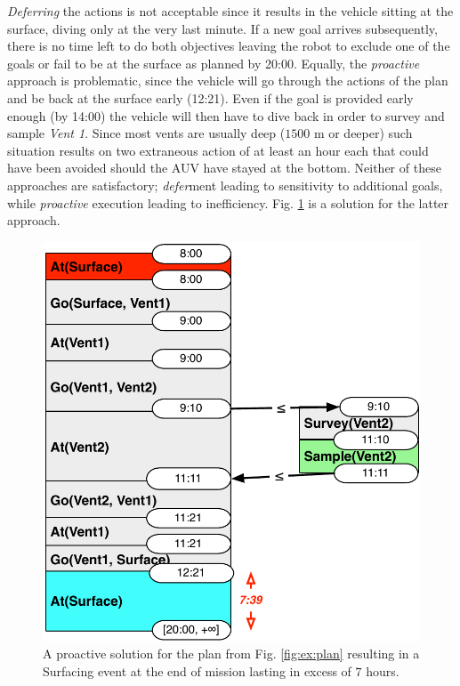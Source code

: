 {\em Deferring} the actions is not acceptable since it results in the
vehicle sitting at the surface, diving only at the very last
minute. If a new goal arrives subsequently, there is no time left to
do both objectives leaving the robot to exclude one of the goals or
fail to be at the surface as planned by 20:00. Equally, the {\em
  proactive} approach is problematic, since the vehicle will go
through the actions of the plan and be back at the surface early
(12:21). Even if the goal is provided early enough (by 14:00) the
vehicle will then have to dive back in order to survey and sample {\em
  Vent 1}.
Since most vents are usually deep ($1500$ m or deeper) such situation
results on two extraneous action of at least an hour each that could
have been avoided should the AUV have stayed at the bottom.
Neither of these approaches are satisfactory; {\em defer}ment leading 
to sensitivity to additional goals, while \emph{proactive} execution 
leading to inefficiency. Fig. \ref{fig:ex:proactive} is a solution for the latter
approach.



\begin{figure}
  \centering
  \includegraphics[width=0.65\columnwidth]{figs/example_early}
  \caption{\small A proactive solution for the plan from
    Fig. \ref{fig:ex:plan} resulting in a Surfacing event at the end
    of mission lasting in excess of $7$ hours.}
  \label{fig:ex:proactive}
\end{figure}

